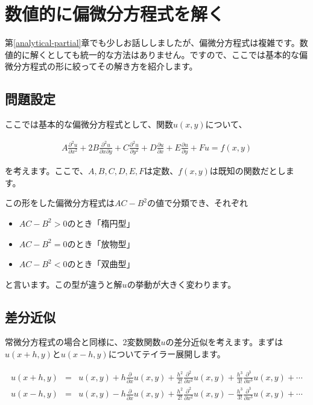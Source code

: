 \chapter{数値的に偏微分方程式を解く}
\label{numerical-partial}
第\ref{analytical-partial}章でも少しお話ししましたが、偏微分方程式は複雑です。数値的に解くとしても統一的な方法はありません。ですので、ここでは基本的な偏微分方程式の形に絞ってその解き方を紹介します。

\section{問題設定}
\label{partial-problem}
ここでは基本的な偏微分方程式として、関数$u(x,y)$について、

\begin{eqnarray}
    A\frac{\partial^2u}{\partial x^2}+2B\frac{\partial^2u}{\partial x\partial y}+C\frac{\partial^2u}{\partial y^2}+D\frac{\partial u}{\partial x}+E\frac{\partial u}{\partial y}+Fu=f(x,y)
    \label{eq:partial-basic}
\end{eqnarray}

\noindent
を考えます。ここで、$A,B,C,D,E,F$は定数、$f(x,y)$は既知の関数だとします。

この形をした偏微分方程式は$AC-B^2$の値で分類でき、それぞれ

\begin{itemize}
    \item $AC-B^2>0$のとき「楕円型」
    \item $AC-B^2=0$のとき「放物型」
    \item $AC-B^2<0$のとき「双曲型」
\end{itemize}

\noindent
と言います。この型が違うと解$u$の挙動が大きく変わります。







\section{差分近似}
\label{partial-difference-calc}
常微分方程式の場合と同様に、2変数関数$u$の差分近似を考えます。まずは$u(x+h,y)$と$u(x-h,y)$についてテイラー展開します。

\begin{eqnarray}
    \label{eq:partial-u-x-1}
    u(x+h,y)&=&u(x,y)+h\frac{\partial}{\partial x}u(x,y)+\frac{h^2}{2!}\frac{\partial^2}{\partial x^2}u(x,y)+\frac{h^3}{3!}\frac{\partial^3}{\partial x^3}u(x,y)+\cdots \\
    \label{eq:partial-u-x-2}
    u(x-h,y)&=&u(x,y)-h\frac{\partial}{\partial x}u(x,y)+\frac{h^2}{2!}\frac{\partial^2}{\partial x^2}u(x,y)-\frac{h^3}{3!}\frac{\partial^3}{\partial x^3}u(x,y)+\cdots
\end{eqnarray}

